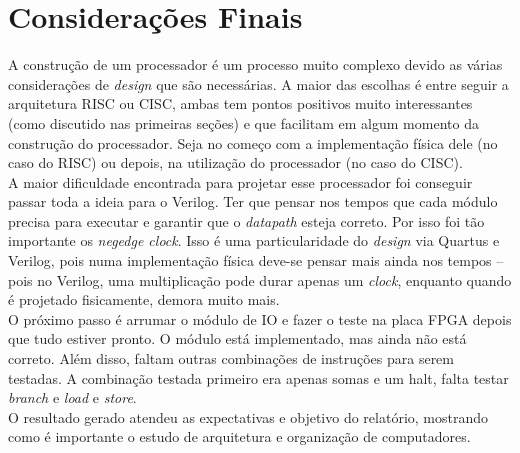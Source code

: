 \documentclass[
	12pt,
	openright,
	a4paper,
	english,			
	french,				
	spanish,			
	brazil,				
	]{abntex2}
\begin{document}
\chapter{Considerações Finais}
A construção de um processador é um processo muito complexo 
devido as várias considerações de \textit{design} que são 
necessárias. A maior das escolhas é entre seguir a arquitetura 
RISC ou CISC, ambas tem pontos positivos muito interessantes 
(como discutido nas primeiras seções) e que facilitam em algum 
momento da construção do processador. Seja no começo com a 
implementação física dele (no caso do RISC) ou depois, na 
utilização do processador (no caso do CISC).\\
A maior dificuldade encontrada para projetar esse processador foi 
conseguir passar toda a ideia para o Verilog. Ter que pensar nos 
tempos que cada módulo precisa para executar e garantir que o 
\emph{datapath} esteja correto. Por isso foi tão importante os 
\emph{negedge clock}. Isso é uma particularidade do \emph{design} via 
Quartus e Verilog, pois numa implementação física deve-se pensar mais ainda nos tempos -- 
pois no Verilog, uma multiplicação pode durar apenas um \emph{clock}, enquanto
quando é projetado fisicamente, demora muito mais. \\
O próximo passo é arrumar o módulo de IO e fazer o teste na placa FPGA depois 
que tudo estiver pronto. O módulo está implementado, mas ainda não está correto. Além disso, faltam 
outras combinações de instruções para serem testadas. A combinação testada primeiro era apenas somas e um halt,
falta testar \emph{branch} e \emph{load} e \emph{store}.\\
O resultado gerado atendeu as expectativas e objetivo do 
relatório, mostrando como é importante o estudo de arquitetura 
e organização de computadores.


\postextual

\printindex
\end{document}
